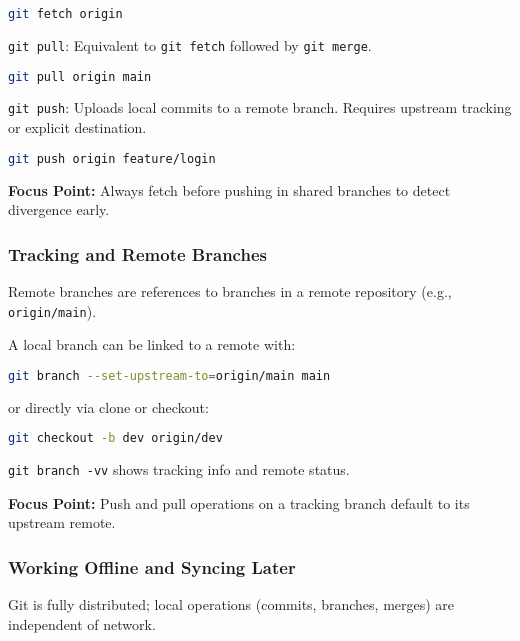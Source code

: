 \documentclass[a4paper,12pt]{article}
\begin{document}
\begin{lstlisting}[language=bash]
git fetch origin
\end{lstlisting}

\texttt{git pull}: Equivalent to \texttt{git fetch} followed by \texttt{git merge}.

\begin{lstlisting}[language=bash]
git pull origin main
\end{lstlisting}

\texttt{git push}: Uploads local commits to a remote branch. Requires upstream tracking or explicit destination.

\begin{lstlisting}[language=bash]
git push origin feature/login
\end{lstlisting}

\textbf{Focus Point:} Always fetch before pushing in shared branches to detect divergence early.

\subsubsection{Tracking and Remote Branches}

Remote branches are references to branches in a remote repository (e.g., \texttt{origin/main}).

A local branch can be linked to a remote with:

\begin{lstlisting}[language=bash]
git branch --set-upstream-to=origin/main main
\end{lstlisting}

or directly via clone or checkout:

\begin{lstlisting}[language=bash]
git checkout -b dev origin/dev
\end{lstlisting}

\texttt{git branch -vv} shows tracking info and remote status.

\textbf{Focus Point:} Push and pull operations on a tracking branch default to its upstream remote.

\subsubsection{Working Offline and Syncing Later}

Git is fully distributed; local operations (commits, branches, merges) are independent of network.
\end{document}
